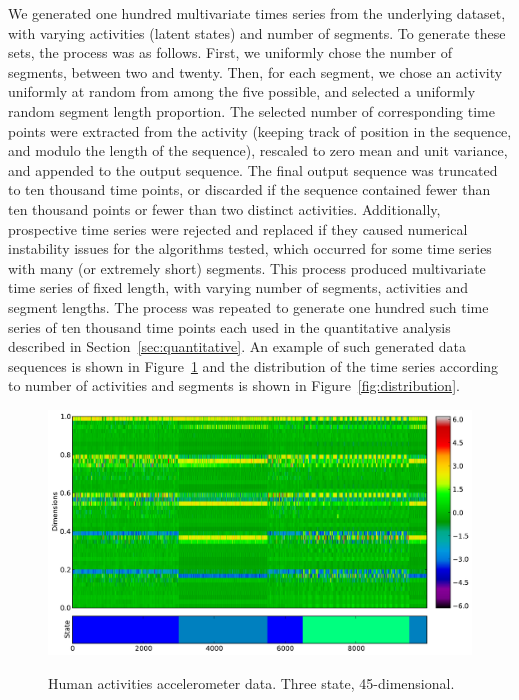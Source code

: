 \documentclass[12pt]{article}
\begin{document}
We generated one hundred multivariate times series from the underlying dataset, with varying activities (latent states) and number of segments. To generate these sets, the process was as follows. First, we uniformly chose the number of segments, between two and twenty. Then, for each segment, we chose an activity uniformly at random from among the five possible, and selected a uniformly random segment length proportion. The selected number of corresponding time points were extracted from the activity (keeping track of position in the sequence, and modulo the length of the sequence), rescaled to zero mean and unit variance, and appended to the output sequence. The final output sequence was truncated to ten thousand time points, or discarded if the sequence contained fewer than ten thousand points or fewer than two distinct activities. Additionally, prospective time series were rejected and replaced if they caused numerical instability issues for the algorithms tested, which occurred for some time series with many (or extremely short) segments. This process produced multivariate time series of fixed length, with varying number of segments, activities and segment lengths. The process was repeated to generate one hundred such time series of ten thousand time points each used in the quantitative analysis described in Section~\ref{sec:quantitative}. An example of such generated data sequences is shown in Figure~\ref{fig:accelerometer} and the distribution of the time series according to number of activities and segments is shown in Figure~\ref{fig:distribution}.

\begin{figure}[htbp]
  \caption{Human activities accelerometer data. Three state, 45-dimensional.}
  \centering
    \includegraphics[width=1.\linewidth]{images/accelerometer-data.pdf}
    \label{fig:accelerometer}
\end{figure}
\end{document}
